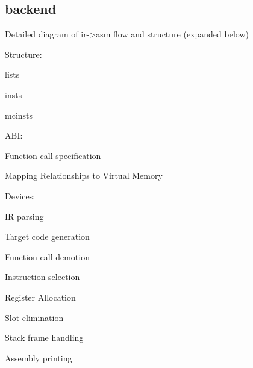 \subsection{backend} \label{sec:backend}

Detailed diagram of ir->asm flow and structure (expanded below)

Structure:

    lists

    insts

    mcinsts

ABI:

    Function call specification

    Mapping Relationships to Virtual Memory

Devices:

    IR parsing

    Target code generation

        Function call demotion

        Instruction selection

        Register Allocation

        Slot elimination

        Stack frame handling

        Assembly printing